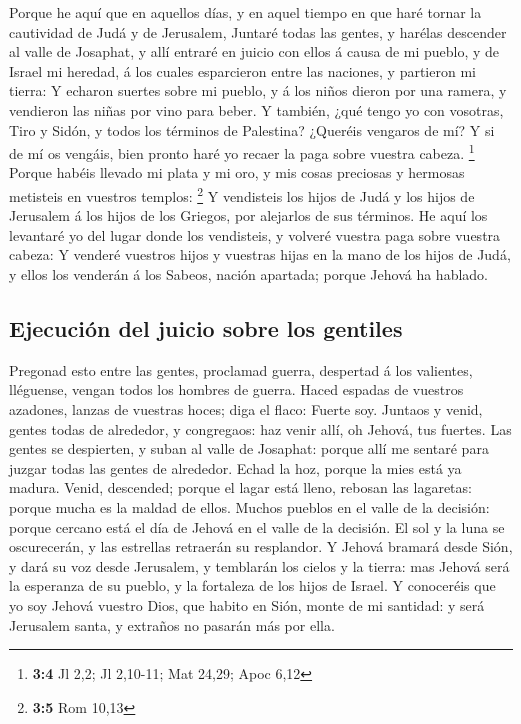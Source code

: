  Porque he aquí que en aquellos días, y en aquel tiempo en
que haré tornar la cautividad de Judá y de Jerusalem, 
Juntaré todas las gentes, y harélas descender al valle de Josaphat, y
allí entraré en juicio con ellos á causa de mi pueblo, y de Israel mi
heredad, á los cuales esparcieron entre las naciones, y partieron mi
tierra:  Y echaron suertes sobre mi pueblo, y á los niños
dieron por una ramera, y vendieron las niñas por vino para beber.
 Y también, ¿qué tengo yo con vosotras, Tiro y Sidón, y
todos los términos de Palestina? ¿Queréis vengaros de mí? Y si de mí os
vengáis, bien pronto haré yo recaer la paga sobre vuestra cabeza.
\footnote{\textbf{3:4} Jl 2,2; Jl 2,10-11; Mat 24,29; Apoc 6,12}
 Porque habéis llevado mi plata y mi oro, y mis cosas
preciosas y hermosas metisteis en vuestros templos: \footnote{\textbf{3:5}
  Rom 10,13}  Y vendisteis los hijos de Judá y los hijos de
Jerusalem á los hijos de los Griegos, por alejarlos de sus términos.
 He aquí los levantaré yo del lugar donde los vendisteis, y
volveré vuestra paga sobre vuestra cabeza:  Y venderé
vuestros hijos y vuestras hijas en la mano de los hijos de Judá, y ellos
los venderán á los Sabeos, nación apartada; porque Jehová ha hablado.

\hypertarget{ejecuciuxf3n-del-juicio-sobre-los-gentiles}{%
\subsection{Ejecución del juicio sobre los
gentiles}\label{ejecuciuxf3n-del-juicio-sobre-los-gentiles}}

 Pregonad esto entre las gentes, proclamad guerra, despertad
á los valientes, lléguense, vengan todos los hombres de guerra.
 Haced espadas de vuestros azadones, lanzas de vuestras
hoces; diga el flaco: Fuerte soy.  Juntaos y venid, gentes
todas de alrededor, y congregaos: haz venir allí, oh Jehová, tus
fuertes.  Las gentes se despierten, y suban al valle de
Josaphat: porque allí me sentaré para juzgar todas las gentes de
alrededor.  Echad la hoz, porque la mies está ya madura.
Venid, descended; porque el lagar está lleno, rebosan las lagaretas:
porque mucha es la maldad de ellos.  Muchos pueblos en el
valle de la decisión: porque cercano está el día de Jehová en el valle
de la decisión.  El sol y la luna se oscurecerán, y las
estrellas retraerán su resplandor.  Y Jehová bramará desde
Sión, y dará su voz desde Jerusalem, y temblarán los cielos y la tierra:
mas Jehová será la esperanza de su pueblo, y la fortaleza de los hijos
de Israel.  Y conoceréis que yo soy Jehová vuestro Dios,
que habito en Sión, monte de mi santidad: y será Jerusalem santa, y
extraños no pasarán más por ella.

